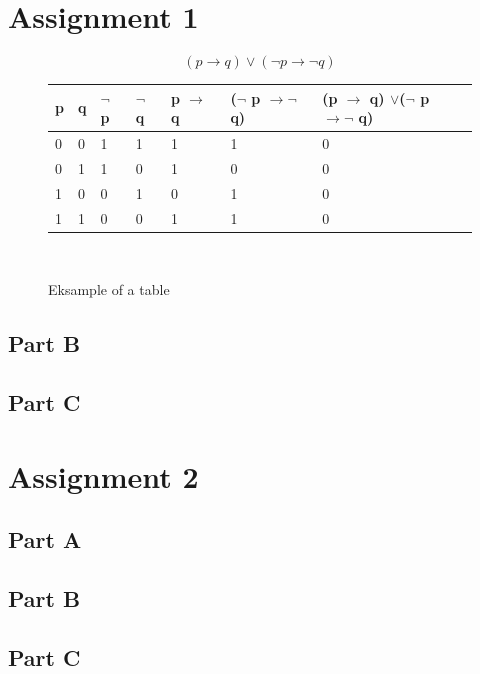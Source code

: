 \documentclass[a4paper,10pt,titlepage]{report}
\begin{document}
\section{Assignment 1}
\begin{equation*}
(p \rightarrow q)\lor(\neg p \rightarrow \neg q)
\end{equation*}
\begin{figure} [h]
\begin{tabular}{l|l|l|l|l|l|l}

p & q & $\neg $ p & $\neg $ q & p $\rightarrow $ q & ($\neg $ p $\rightarrow \neg $ q) & (p $ \rightarrow $ q) $\lor $($\neg $ p $\rightarrow \neg $ q) \\ \hline 
0  & 0  & 1  & 1  & 1 & 1 & 0 \\ 
0  & 1  & 1  & 0  & 1 & 0 & 0 \\ 
1  & 0  & 0  & 1  & 0 & 1 & 0 \\ 
1  & 1  & 0  & 0  & 1 & 1 & 0 \\

\end{tabular}
\vspace{2mm} \\
\caption{Eksample of a table\label{fig:gull}}
\end{figure}

\subsection{Part B}

\subsection{Part C}

\section{Assignment 2}

\subsection{Part A}

\subsection{Part B}

\subsection{Part C}
\end{document}
